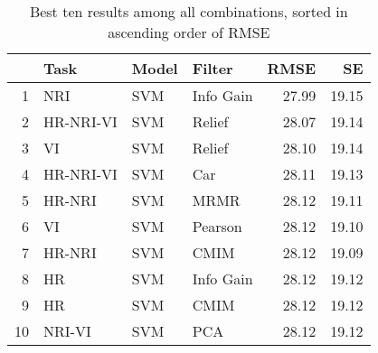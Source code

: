 \begin{table}[ht!]
\centering
\caption{Best ten results among all combinations, sorted in ascending order of RMSE} 
\label{tab:perf-top-10}
\begin{tabular}{rlllrr}
  \hline
 & Task & Model & Filter & RMSE & SE \\ 
  \hline
1 & NRI & SVM & Info Gain & 27.99 & 19.15 \\ 
  2 & HR-NRI-VI & SVM & Relief & 28.07 & 19.14 \\ 
  3 & VI & SVM & Relief & 28.10 & 19.14 \\ 
  4 & HR-NRI-VI & SVM & Car & 28.11 & 19.13 \\ 
  5 & HR-NRI & SVM & MRMR & 28.12 & 19.11 \\ 
  6 & VI & SVM & Pearson & 28.12 & 19.10 \\ 
  7 & HR-NRI & SVM & CMIM & 28.12 & 19.09 \\ 
  8 & HR & SVM & Info Gain & 28.12 & 19.12 \\ 
  9 & HR & SVM & CMIM & 28.12 & 19.12 \\ 
  10 & NRI-VI & SVM & PCA & 28.12 & 19.12 \\ 
   \hline
\end{tabular}
\end{table}
